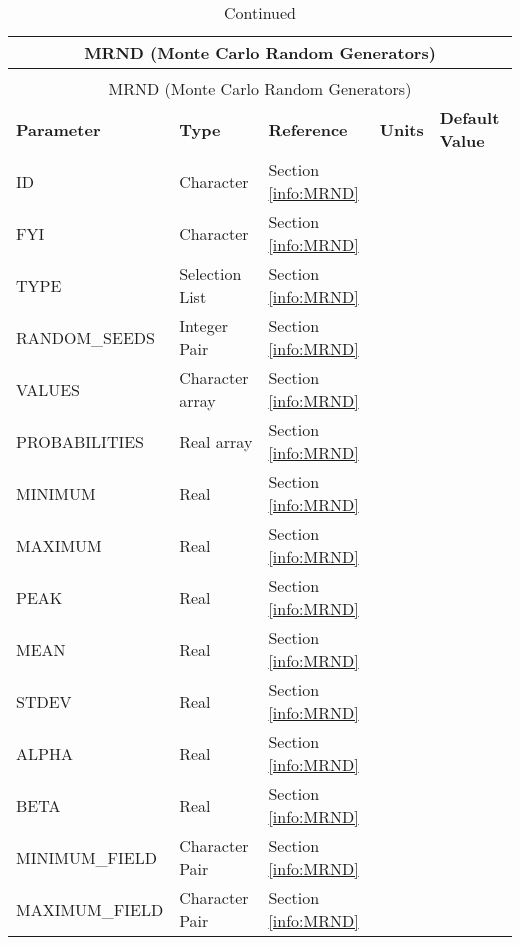 \noindent
\renewcommand{\tabcolsep}{.1in}
\begin{longtable}{|l|l|l|l|l|}
\caption[Monte Carlo Random Generators ({\ct MRND} namelist group)]{For more information see Section~\ref{info:MRND}.}
\label{tbl:MRND} \\
\hline
\multicolumn{5}{|c|}{{\ct MRND} (Monte Carlo Random Generators)} \\
\hline \hline
\endfirsthead
\caption[]{Continued} \\
\hline
\multicolumn{5}{|c|}{{\ct MRND} (Monte Carlo Random Generators)} \\
\hline \hline
\endhead
\small
\parbox{1.5in}{\bf Parameter}    & \parbox{1in}{\bf Type}  & \parbox{1in}{\bf Reference}  & \parbox{1in}{\bf Units}  & \parbox{1in}{\bf Default Value} \\ \hline
{\ct ID}                & Character         & Section \ref{info:MRND}   &      &     \\ \hline
{\ct FYI}               & Character         & Section \ref{info:MRND}   &      &     \\ \hline
{\ct TYPE}              & Selection List    & Section \ref{info:MRND}   &      &     \\ \hline
{\ct RANDOM\_SEEDS}     & Integer Pair      & Section \ref{info:MRND}   &      &     \\ \hline
{\ct VALUES}            & Character array   & Section \ref{info:MRND}   &      &     \\ \hline
{\ct PROBABILITIES}     & Real array        & Section \ref{info:MRND}   &      &     \\ \hline
{\ct MINIMUM}           & Real              & Section \ref{info:MRND}   &      &     \\ \hline
{\ct MAXIMUM}           & Real              & Section \ref{info:MRND}   &      &     \\ \hline
{\ct PEAK}              & Real              & Section \ref{info:MRND}   &      &     \\ \hline
{\ct MEAN}              & Real              & Section \ref{info:MRND}   &      &     \\ \hline
{\ct STDEV}             & Real              & Section \ref{info:MRND}   &      &     \\ \hline
{\ct ALPHA}             & Real              & Section \ref{info:MRND}   &      &     \\ \hline
{\ct BETA}              & Real              & Section \ref{info:MRND}   &      &     \\ \hline
{\ct MINIMUM\_FIELD}    & Character Pair    & Section \ref{info:MRND}   &      &     \\ \hline
{\ct MAXIMUM\_FIELD}    & Character Pair    & Section \ref{info:MRND}   &      &     \\ \hline

\end{longtable}

